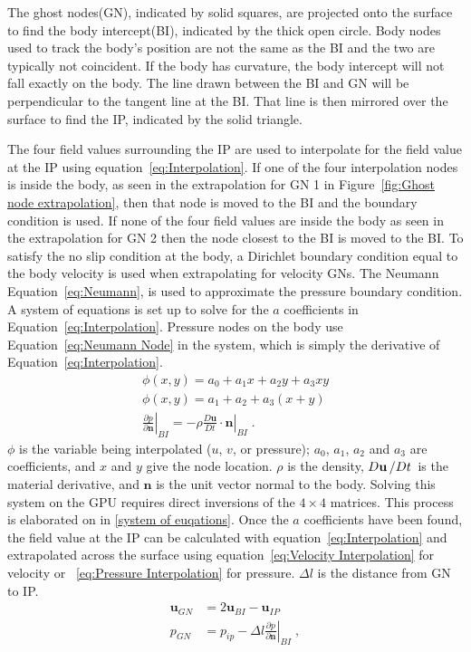 \documentclass[onehalf,11pt]{beavtex}
\begin{document}
The ghost nodes(GN), indicated by solid squares, are projected onto the surface to find the body intercept(BI), indicated by the thick open circle.
Body nodes used to track the body's position are not the same as the BI and the two are typically not coincident.
If the body has curvature, the body intercept will not fall exactly on the body.
The line drawn between the BI and GN will be perpendicular to the tangent line at the BI.
That line is then mirrored over the surface to find the IP, indicated by the solid triangle. 

The four field values surrounding the IP are used to interpolate for the field value at the IP using equation~\eqref{eq:Interpolation}. 
If one of the four interpolation nodes is inside the body, as seen in the extrapolation for GN 1 in Figure~\ref{fig:Ghost node extrapolation}, then that node is moved to the BI and the boundary condition is used.
If none of the four field values are inside the body as seen in the extrapolation for GN 2 then the node closest to the BI is moved to the BI.
To satisfy the no slip condition at the body, a Dirichlet boundary condition equal to the body velocity is used when extrapolating for velocity GNs. 
The Neumann Equation~\eqref{eq:Neumann}, is used to approximate the pressure boundary condition.
A system of equations is set up to solve for the $a$ coefficients in Equation~\eqref{eq:Interpolation}.
Pressure nodes on the body use Equation~\eqref{eq:Neumann Node} in the system, which is simply the derivative of Equation~\eqref{eq:Interpolation}. 
\begin{align}
\phi (x,y) = a_0 + a_1 x + a_2y + a_3 x y \label{eq:Interpolation} \\
\phi (x,y) = a_1 + a_2 + a_3 (x+y) \label{eq:Neumann Node} \\
\left. \frac{\partial p}{\partial \textbf{n}}\right|_{BI} = \left. -\rho \frac{D\textbf{u}}{Dt}\cdot \textbf{n}\right|_{BI}
\label{eq:Neumann}\;.
\end{align}
$\phi$ is the variable being interpolated ($u$, $v$, or pressure); $a_0$, $a_1$, $a_2$ and $a_3$ are coefficients, and $x$ and $y$ give the node location.
$\rho$ is the density, $D\textbf{u}\left/Dt\right.$ is the material derivative, and $\textbf{n}$ is the unit vector normal to the body.
Solving this system on the GPU requires direct inversions of the $4 \times 4$ matrices.
This process is elaborated on in \ref{system of euqations}.
Once the $a$ coefficients have been found, the field value at the IP can be calculated with equation~\eqref{eq:Interpolation} and extrapolated across the surface using equation~\eqref{eq:Velocity Interpolation} for velocity or ~\eqref{eq:Pressure Interpolation} for pressure. 
$\Delta l$ is the distance from GN to IP.
\begin{align}
\textbf{u}_{GN} &= 2\textbf{u}_{BI} - \textbf{u}_{IP} \label{eq:Velocity Interpolation} \\
p_{GN} &= p_{ip} - \Delta l \left. \frac{\partial p}{\partial \textbf{n}}\right|_{BI} \;, \label{eq:Pressure Interpolation}
\end{align}
\end{document}
